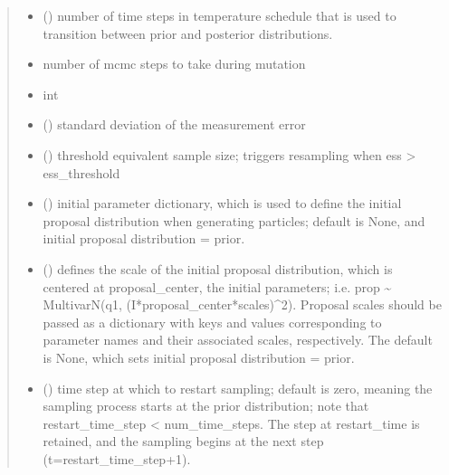 \documentclass[letterpaper,10pt,english]{sphinxmanual}
\begin{document}
\begin{fulllineitems}
\begin{fulllineitems}
\begin{quote}
\begin{description}
\begin{itemize}
\item {} 
 () \textendash{} number of time steps in temperature schedule that
is used to transition between prior and posterior distributions.

\item {} 
 \textendash{} number of mcmc steps to take during mutation

\item {} 
 \textendash{} int

\item {} 
 () \textendash{} standard deviation of the measurement error

\item {} 
 () \textendash{} threshold equivalent sample size; triggers
resampling when ess \textgreater{} ess\_threshold

\item {} 
 () \textendash{} initial parameter dictionary, which is used to
define the initial proposal distribution when generating particles;
default is None, and initial proposal distribution = prior.

\item {} 
 () \textendash{} defines the scale of the initial proposal
distribution, which is centered at proposal\_center, the initial
parameters; i.e. prop \textasciitilde{} MultivarN(q1, (I*proposal\_center*scales)\textasciicircum{}2).
Proposal scales should be passed as a dictionary with keys and
values corresponding to parameter names and their associated scales,
respectively. The default is None, which sets initial proposal
distribution = prior.

\item {} 
 () \textendash{} time step at which to restart sampling;
default is zero, meaning the sampling process starts at the prior
distribution; note that restart\_time\_step \textless{} num\_time\_steps. The
step at restart\_time is retained, and the sampling begins at the
next step (t=restart\_time\_step+1).


\end{itemize}
\end{description}
\end{quote}
\end{fulllineitems}
\end{fulllineitems}
\end{document}
